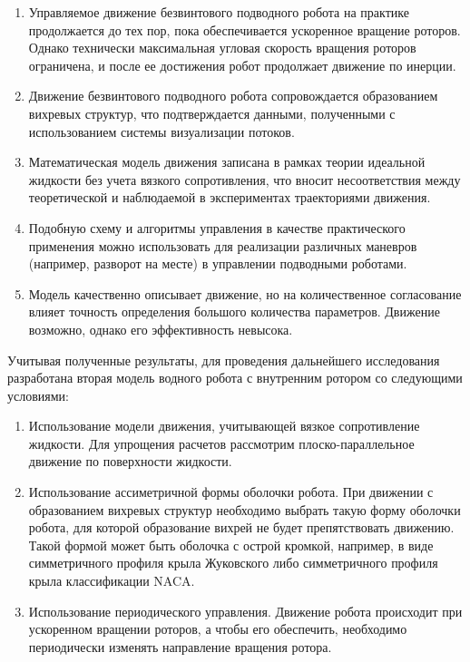 \begin{enumerate}
	\item	Управляемое движение безвинтового подводного робота на практике продолжается до тех пор, пока обеспечивается ускоренное вращение роторов. Однако технически максимальная угловая скорость вращения роторов ограничена, и после ее достижения робот продолжает движение по инерции.
	\item	Движение безвинтового подводного робота сопровождается образованием вихревых структур, что подтверждается данными, полученными с использованием системы визуализации потоков. %
	\item Математическая модель движения записана в рамках теории идеальной жидкости без учета вязкого сопротивления, что вносит несоответствия между теоретической и наблюдаемой в экспериментах траекториями движения.
	\item Подобную схему и алгоритмы управления в качестве практического применения можно использовать для реализации различных маневров (например, разворот на месте) в управлении подводными роботами.
	\item Модель качественно описывает движение, но на количественное согласование влияет точность определения большого количества параметров. Движение возможно, однако его эффективность невысока.
	
\end{enumerate}

Учитывая полученные результаты, для проведения дальнейшего исследования разработана вторая модель водного робота с внутренним ротором со следующими условиями:

\begin{enumerate}
	\item Использование модели движения, учитывающей вязкое сопротивление жидкости.
	Для упрощения расчетов рассмотрим плоско-параллельное движение по поверхности жидкости.
	
	\item Использование ассиметричной формы оболочки робота. При движении с образованием вихревых структур необходимо выбрать такую форму оболочки робота, для которой образование вихрей не будет препятствовать движению. Такой формой может быть оболочка с острой кромкой, например, в виде симметричного профиля крыла Жуковского либо симметричного профиля крыла классификации NACA.
	
	\item Использование периодического управления. Движение робота происходит при ускоренном вращении роторов, а чтобы его обеспечить, необходимо периодически изменять направление вращения ротора. 
	
\end{enumerate}






